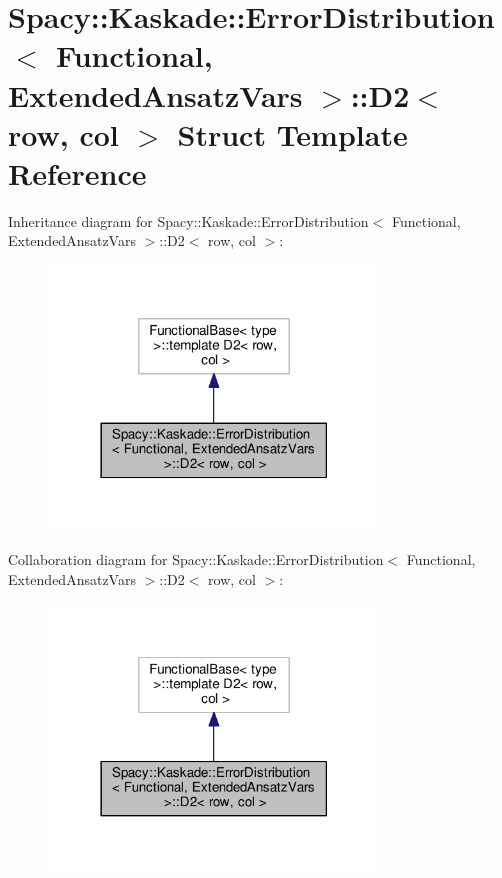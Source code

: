 \hypertarget{structSpacy_1_1Kaskade_1_1ErrorDistribution_1_1D2}{}\section{Spacy\+:\+:Kaskade\+:\+:Error\+Distribution$<$ Functional, Extended\+Ansatz\+Vars $>$\+:\+:D2$<$ row, col $>$ Struct Template Reference}
\label{structSpacy_1_1Kaskade_1_1ErrorDistribution_1_1D2}


Inheritance diagram for Spacy\+:\+:Kaskade\+:\+:Error\+Distribution$<$ Functional, Extended\+Ansatz\+Vars $>$\+:\+:D2$<$ row, col $>$\+:\nopagebreak
\begin{figure}[H]
\begin{center}
\leavevmode
\includegraphics[width=249pt]{structSpacy_1_1Kaskade_1_1ErrorDistribution_1_1D2__inherit__graph}
\end{center}
\end{figure}


Collaboration diagram for Spacy\+:\+:Kaskade\+:\+:Error\+Distribution$<$ Functional, Extended\+Ansatz\+Vars $>$\+:\+:D2$<$ row, col $>$\+:\nopagebreak
\begin{figure}[H]
\begin{center}
\leavevmode
\includegraphics[width=249pt]{structSpacy_1_1Kaskade_1_1ErrorDistribution_1_1D2__coll__graph}
\end{center}
\end{figure}
